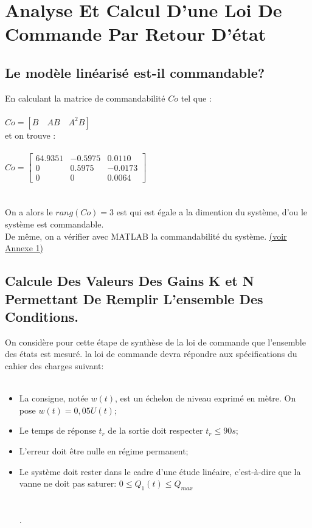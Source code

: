 \chapter{Analyse  Et Calcul  D’une Loi De Commande  Par Retour  D’état }

 \section{Le modèle linéarisé est-il commandable?}
 En calculant la matrice de commandabilité $Co$ tel que : \\\\
 $Co=[B\quad AB \quad A^{2}B]$\\
 et on trouve :\\\\
 
 $Co=\begin{bmatrix} 
64.9351 & -0.5975 & 0.0110 \\
0 & 0.5975 & -0.0173 \\
0 & 0 & 0.0064  
\end{bmatrix}$\\\\\\
 
On a alors le $rang(Co)=3$ est qui est égale a la dimention du système, d'ou le système est commandable.\\  
De même, on a vérifier avec MATLAB la commandabilité du système.  \hyperref[section1.1]{(voir Annexe 1)}\label{annexe1}\\
 
 
 
 
 \section{Calcule Des Valeurs Des Gains K et N Permettant De Remplir L’ensemble Des Conditions.}
  
On considère pour cette étape de synthèse de la loi de commande que l'ensemble des états est mesuré. la loi de commande devra répondre aux spécifications du cahier des charges suivant: \\\\

\begin{itemize}
\item La consigne, notée $w(t)$, est un échelon de niveau exprimé en mètre. On pose $w(t) = 0, 05U(t)$;
\item Le temps de réponse $t_{r}$ de la sortie doit respecter $t_{r} \leq 90 s$;
\item L’erreur doit être nulle en régime permanent;
\item Le système doit rester dans le cadre d’une étude linéaire, c’est-à-dire que la vanne ne doit pas saturer:
$0 \leq Q_{1}(t) \leq Q_{max}$ \cite{ref1}\\\\\\ .
\end{itemize} 
 
